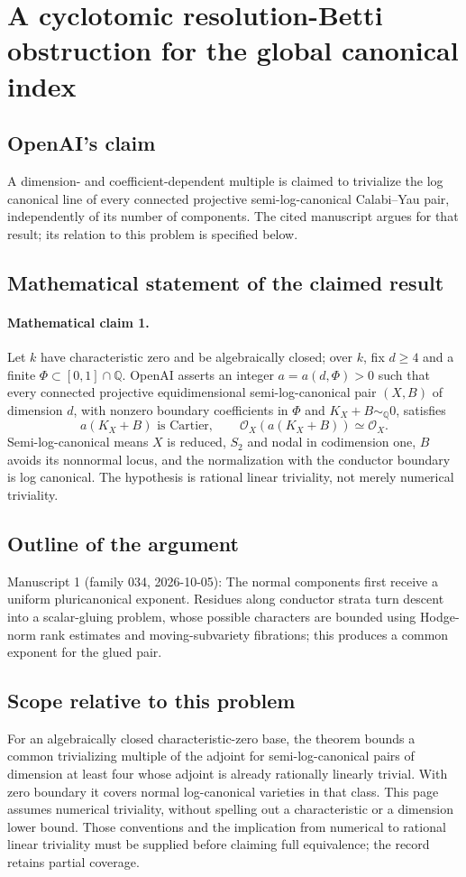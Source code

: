 \documentclass[11pt]{article}
\begin{document}
\section*{A cyclotomic resolution-Betti obstruction for the global canonical index}

\subsection{OpenAI's claim}
A dimension- and coefficient-dependent multiple is claimed to trivialize the log canonical line of every connected projective semi-log-canonical Calabi--Yau pair, independently of its number of components. The cited manuscript argues for that result; its relation to this problem is specified below.

\subsection{Mathematical statement of the claimed result}
\paragraph{Mathematical claim 1.} Let $k$ have characteristic zero and be algebraically closed; over $k$, fix $d\ge4$ and a finite $\Phi\subset[0,1]\cap\mathbb Q$. OpenAI asserts an integer $a=a(d,\Phi)>0$ such that every connected projective equidimensional semi-log-canonical pair $(X,B)$ of dimension $d$, with nonzero boundary coefficients in $\Phi$ and $K_X+B\sim_{\mathbb Q}0$, satisfies
\[
a(K_X+B)\text{ is Cartier},\qquad \mathcal O_X(a(K_X+B))\simeq\mathcal O_X.
\]
Semi-log-canonical means $X$ is reduced, $S_2$ and nodal in codimension one, $B$ avoids its nonnormal locus, and the normalization with the conductor boundary is log canonical. The hypothesis is rational linear triviality, not merely numerical triviality.

\subsection{Outline of the argument}
Manuscript 1 (family 034, 2026-10-05): The normal components first receive a uniform pluricanonical exponent. Residues along conductor strata turn descent into a scalar-gluing problem, whose possible characters are bounded using Hodge-norm rank estimates and moving-subvariety fibrations; this produces a common exponent for the glued pair.

\subsection{Scope relative to this problem}
For an algebraically closed characteristic-zero base, the theorem bounds a common trivializing multiple of the adjoint for semi-log-canonical pairs of dimension at least four whose adjoint is already rationally linearly trivial. With zero boundary it covers normal log-canonical varieties in that class. This page assumes numerical triviality, without spelling out a characteristic or a dimension lower bound. Those conventions and the implication from numerical to rational linear triviality must be supplied before claiming full equivalence; the record retains partial coverage.
\end{document}
